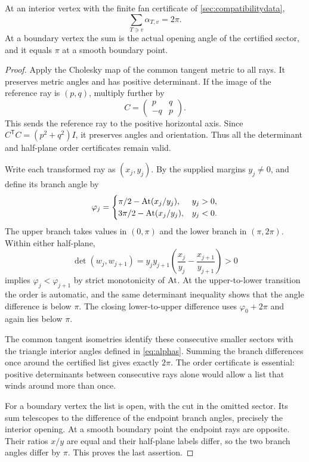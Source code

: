 \begin{lemma}\label{lem:fan}
At an interior vertex with the finite fan certificate of \cref{sec:compatibilitydata},
\[
\sum_{T\ni v}\alpha_{T,v}=2\pi.
\]
At a boundary vertex the sum is the actual opening angle of the certified sector, and it equals $\pi$ at a smooth boundary point.
\end{lemma}
\begin{proof}
Apply the Cholesky map of the common tangent metric to all rays. It preserves metric angles and has positive determinant. If the image of the reference ray is $(p,q)$, multiply further by
\[
C=\begin{pmatrix}p&q\\-q&p\end{pmatrix}.
\]
This sends the reference ray to the positive horizontal axis. Since
$C^{\mathsf T}C=(p^2+q^2)I$, it preserves angles and orientation. Thus all the determinant and half-plane order certificates remain valid.

Write each transformed ray as $(x_j,y_j)$. By the supplied margins $y_j\ne0$, and define its branch angle by
\[
\varphi_j=
\begin{cases}
\pi/2-\operatorname{At}(x_j/y_j),&y_j>0,\\
3\pi/2-\operatorname{At}(x_j/y_j),&y_j<0.
\end{cases}
\]
The upper branch takes values in $(0,\pi)$ and the lower branch in $(\pi,2\pi)$. Within either half-plane,
\[
\det(w_j,w_{j+1})
=y_jy_{j+1}\left(\frac{x_j}{y_j}-\frac{x_{j+1}}{y_{j+1}}\right)>0
\]
implies $\varphi_j<\varphi_{j+1}$ by strict monotonicity of $\operatorname{At}$. At the upper-to-lower transition the order is automatic, and the same determinant inequality shows that the angle difference is below $\pi$. The closing lower-to-upper difference uses $\varphi_0+2\pi$ and again lies below $\pi$.

The common tangent isometries identify these consecutive smaller sectors with the triangle interior angles defined in \eqref{eq:alphas}. Summing the branch differences once around the certified list gives exactly $2\pi$. The order certificate is essential: positive determinants between consecutive rays alone would allow a list that winds around more than once.

For a boundary vertex the list is open, with the cut in the omitted sector. Its sum telescopes to the difference of the endpoint branch angles, precisely the interior opening. At a smooth boundary point the endpoint rays are opposite. Their ratios $x/y$ are equal and their half-plane labels differ, so the two branch angles differ by $\pi$. This proves the last assertion.
\end{proof}

